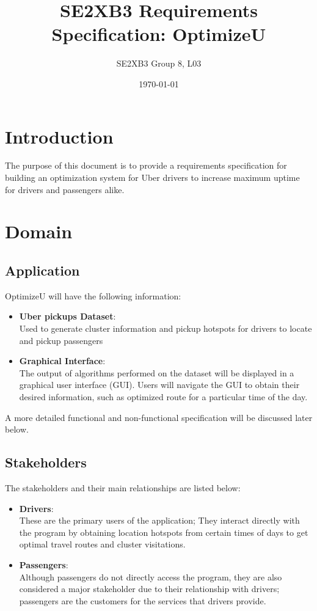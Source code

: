 \documentclass[12pt]{article}
\title{SE2XB3 Requirements Specification: OptimizeU}
\author{SE2XB3 Group 8, L03}
\date{\today}
\begin{document}
\maketitle
\tableofcontents

\newpage
\section{Introduction}
The purpose of this document is to provide a requirements specification for
building an optimization system for Uber drivers to increase maximum uptime
for drivers and passengers alike.
\section{Domain}
\subsection{Application}
OptimizeU will have the following information:
\begin{itemize}
	\item \textbf{Uber pickups Dataset}:\\
	       Used to generate cluster information and pickup hotspots for
	       drivers to locate and pickup passengers
	\item \textbf{Graphical Interface}:\\
	       The output of algorithms performed on the dataset will be
	       displayed in a graphical user interface (GUI). Users will
	       navigate the GUI to obtain their desired information, such as 
	       optimized route for a particular time of the day.
\end{itemize} 
A more detailed functional and non-functional specification will be 
discussed later below.
\subsection{Stakeholders}
The stakeholders and their main relationships are listed below:
\begin{itemize}
	\item \textbf{Drivers}:\\
		These are the primary users of the application; They interact 
		directly with the program by obtaining location hotspots from
		certain times of days to get optimal travel routes and cluster
		visitations. 
	\item \textbf{Passengers}:\\
		Although passengers do not directly access the program, they
		are also considered a major stakeholder due to their relationship
		with drivers; passengers are the customers for the services that
		drivers provide.
\end{itemize}
\end{document}
